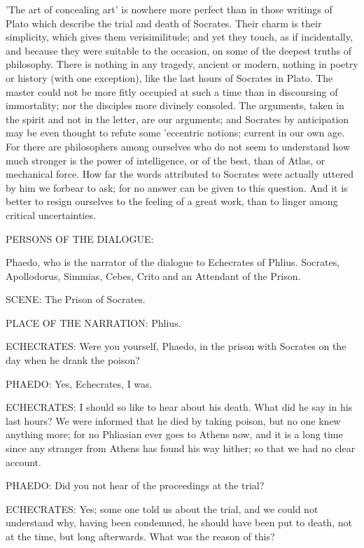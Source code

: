 'The art of concealing art' is nowhere more perfect than in those writings
of Plato which describe the trial and death of Socrates. Their charm is
their simplicity, which gives them verisimilitude; and yet they touch, as
if incidentally, and because they were suitable to the occasion, on some
of the deepest truths of philosophy. There is nothing in any tragedy,
ancient or modern, nothing in poetry or history (with one exception), like
the last hours of Socrates in Plato. The master could not be more fitly
occupied at such a time than in discoursing of immortality; nor the
disciples more divinely consoled. The arguments, taken in the spirit and
not in the letter, are our arguments; and Socrates by anticipation may be
even thought to refute some 'eccentric notions; current in our own age.
For there are philosophers among ourselves who do not seem to understand
how much stronger is the power of intelligence, or of the best, than of
Atlas, or mechanical force. How far the words attributed to Socrates were
actually uttered by him we forbear to ask; for no answer can be given to
this question. And it is better to resign ourselves to the feeling of a
great work, than to linger among critical uncertainties.


PERSONS OF THE DIALOGUE:

Phaedo, who is the narrator of the dialogue to Echecrates of Phlius.
Socrates, Apollodorus, Simmias, Cebes, Crito and an Attendant of the
Prison.

SCENE: The Prison of Socrates.

PLACE OF THE NARRATION: Phlius.

ECHECRATES: Were you yourself, Phaedo, in the prison with Socrates on the
day when he drank the poison?

PHAEDO: Yes, Echecrates, I was.

ECHECRATES: I should so like to hear about his death. What did he say in
his last hours? We were informed that he died by taking poison, but no one
knew anything more; for no Phliasian ever goes to Athens now, and it is a
long time since any stranger from Athens has found his way hither; so that
we had no clear account.

PHAEDO: Did you not hear of the proceedings at the trial?

ECHECRATES: Yes; some one told us about the trial, and we could not
understand why, having been condemned, he should have been put to death,
not at the time, but long afterwards. What was the reason of this?

